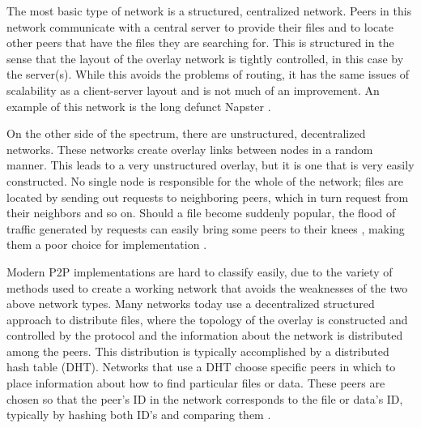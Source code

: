 \documentclass[conference, compsocconf, letterpaper]{IEEEtran}
\begin{document}
The most basic type of network is a structured, centralized  network.  Peers in this network communicate with a central server to provide their files and to locate other peers that have the files they are searching for.  This is structured in the sense that the layout of the overlay network is tightly controlled, in this case by the server(s). While this avoids the problems of routing, it has the same issues of scalability as a client-server layout and is not much of an improvement. An example of this network is the long defunct Napster  \cite{SurveyCompare} \cite{Overview}.

On the other side of the spectrum, there are unstructured, decentralized networks.  These networks create overlay links between nodes in a random manner. This leads to a very unstructured overlay, but it is one that is very easily constructed.  No single node is responsible for the whole of the network;  files are located by sending out requests to neighboring peers, which in turn request from their neighbors and so on. Should a file become suddenly popular, the flood of traffic generated by requests can easily bring some peers to their knees \cite{Lv:2002:SRU:514191.514206}, making them a poor choice for implementation \cite{Overview}.

Modern P2P implementations are hard to classify easily, due to the variety of methods used to create a working network that avoids the weaknesses of the two above network types.  Many networks today use a decentralized structured approach to distribute files, where the topology of the overlay is constructed and controlled by the protocol and the information about the network is distributed among the peers.  This distribution is typically accomplished by a distributed hash table (DHT).  Networks that use a DHT choose specific peers in which to place information about how to find particular files or data.  These peers are chosen so that the peer's ID in the network corresponds to the file or data's ID, typically by hashing both ID's and comparing them  \cite{SurveyCompare}. 
\end{document}
